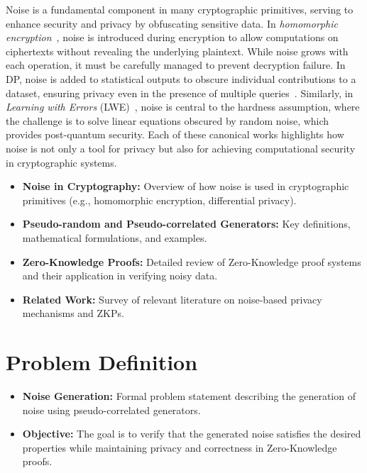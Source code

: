 \documentclass[11pt]{article}
\begin{document}
Noise is a fundamental component in many cryptographic primitives, serving to enhance security and privacy by obfuscating sensitive data. 
In \emph{homomorphic encryption}~\cite{gentry2009fully}, noise is introduced during encryption to allow computations on ciphertexts without revealing the underlying plaintext. 
While noise grows with each operation, it must be carefully managed to prevent decryption failure. 
In DP, noise is added to statistical outputs to obscure individual contributions to a dataset, ensuring privacy even in the presence of multiple queries~\cite{dwork2006differential}. 
Similarly, in \emph{Learning with Errors} (LWE)~\cite{regev2009lattices}, noise is central to the hardness assumption, where the challenge is to solve linear equations obscured by random noise, which provides post-quantum security.
Each of these canonical works highlights how noise is not only a tool for privacy but also for achieving computational security in cryptographic systems.
\begin{itemize}
    \item \textbf{Noise in Cryptography:} Overview of how noise is used in cryptographic primitives (e.g., homomorphic encryption, differential privacy).
    \item \textbf{Pseudo-random and Pseudo-correlated Generators:} Key definitions, mathematical formulations, and examples.
    \item \textbf{Zero-Knowledge Proofs:} Detailed review of Zero-Knowledge proof systems and their application in verifying noisy data.
    \item \textbf{Related Work:} Survey of relevant literature on noise-based privacy mechanisms and ZKPs.
\end{itemize}

\section{Problem Definition}
\begin{itemize}
    \item \textbf{Noise Generation:} Formal problem statement describing the generation of noise using pseudo-correlated generators.
    \item \textbf{Objective:} The goal is to verify that the generated noise satisfies the desired properties while maintaining privacy and correctness in Zero-Knowledge proofs.
\end{itemize}
\end{document}
